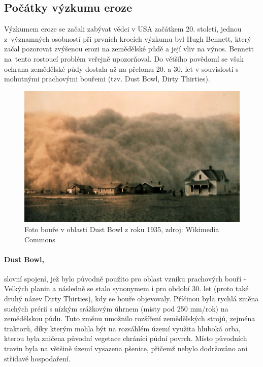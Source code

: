 \subsection{Počátky výzkumu eroze}
Výzkumem eroze se začali zabývat vědci v USA začátkem 20. století,
jednou z~významných osobností při prvních krocích výzkumu byl Hugh
Bennett, který začal pozorovat zvýšenou erozi na zemědělské půdě a
její vliv na výnos. Bennett na~tento \hbox{rostoucí} problém veřejně
upozorňoval. Do většího povědomí se však ochrana zemědělské půdy
dostala až na přelomu 20. a 30. let v souvislosti s mohutnými
prachovými bouřemi (tzv. Dust Bowl, Dirty Thirties).\cite{usda_ars}
\begin{figure}[H]
    \centering \includegraphics[scale=0.7]{./pictures/Dust_bowl.png}
      \caption[Foto bouře v oblasti Dust Bowl z roku 1935]{Foto bouře
        v oblasti Dust Bowl z roku 1935, zdroj: Wikimedia
        Commons\cite{wikicommons}}
      \label{fig:dust_bowl}
\end{figure}

\paragraph{Dust Bowl,} slovní spojení, jež bylo původně použito pro oblast vzniku prachových
bouří - Velkých planin a následně se stalo synonymem i pro období
30. let (proto také druhý název Dirty Thirties), kdy se bouře
objevovaly. Příčinou byla rychlá změna suchých prérií s nízkým
srážkovým úhrnem (místy pod 250 mm/rok) na zemědělskou půdu. Tuto
změnu umožnilo rozšíření zemědělských strojů, zejména traktorů, díky
kterým mohla být na rozsáhlém území využita hluboká orba, kterou byla
zničena původní vegetace chránící půdní povrch. Místo původních travin
byla na většině území vysazena pšenice, přičemž nebylo dodržováno ani
střídavé hospodaření.

